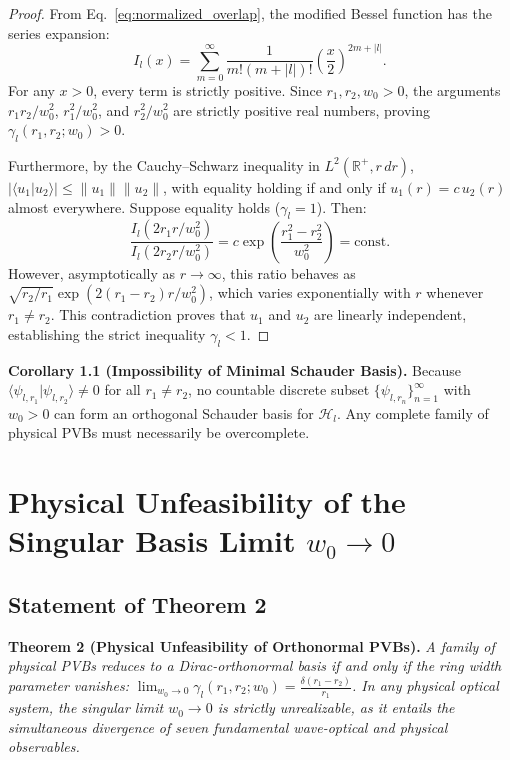 \documentclass{optica-article}
\begin{document}
\begin{proof}
From Eq.~\eqref{eq:normalized_overlap}, the modified Bessel function has the series expansion:
\begin{equation}
I_l(x) = \sum_{m=0}^\infty \frac{1}{m! (m + |l|)!} \left( \frac{x}{2} \right)^{2m + |l|}.
\end{equation}
For any $x > 0$, every term is strictly positive. Since $r_1, r_2, w_0 > 0$, the arguments $r_1 r_2 / w_0^2$, $r_1^2 / w_0^2$, and $r_2^2 / w_0^2$ are strictly positive real numbers, proving $\gamma_l(r_1, r_2; w_0) > 0$.

Furthermore, by the Cauchy--Schwarz inequality in $L^2(\mathbb{R}^+, r \, dr)$, $|\langle u_1 | u_2 \rangle| \le \|u_1\| \|u_2\|$, with equality holding if and only if $u_1(r) = c \, u_2(r)$ almost everywhere. Suppose equality holds ($\gamma_l = 1$). Then:
\begin{equation}
\frac{I_l(2 r_1 r / w_0^2)}{I_l(2 r_2 r / w_0^2)} = c \exp\left( \frac{r_1^2 - r_2^2}{w_0^2} \right) = \text{const}.
\end{equation}
However, asymptotically as $r \to \infty$, this ratio behaves as $\sqrt{r_2 / r_1} \exp(2(r_1 - r_2)r / w_0^2)$, which varies exponentially with $r$ whenever $r_1 \neq r_2$. This contradiction proves that $u_1$ and $u_2$ are linearly independent, establishing the strict inequality $\gamma_l < 1$.
\end{proof}

\noindent\textbf{Corollary 1.1 (Impossibility of Minimal Schauder Basis).}  
Because $\langle \psi_{l, r_1} | \psi_{l, r_2} \rangle \neq 0$ for all $r_1 \neq r_2$, no countable discrete subset $\{\psi_{l, r_n}\}_{n=1}^\infty$ with $w_0 > 0$ can form an orthogonal Schauder basis for $\mathcal{H}_l$. Any complete family of physical PVBs must necessarily be overcomplete.

\section{Physical Unfeasibility of the Singular Basis Limit $w_0 \to 0$}
\label{sec:unfeasibility}

\subsection{Statement of Theorem 2}

\noindent\textbf{Theorem 2 (Physical Unfeasibility of Orthonormal PVBs).}  
\emph{A family of physical PVBs reduces to a Dirac-orthonormal basis if and only if the ring width parameter vanishes: $\lim_{w_0 \to 0} \gamma_l(r_1, r_2; w_0) = \frac{\delta(r_1 - r_2)}{r_1}$. In any physical optical system, the singular limit $w_0 \to 0$ is strictly unrealizable, as it entails the simultaneous divergence of seven fundamental wave-optical and physical observables.}
\end{document}
